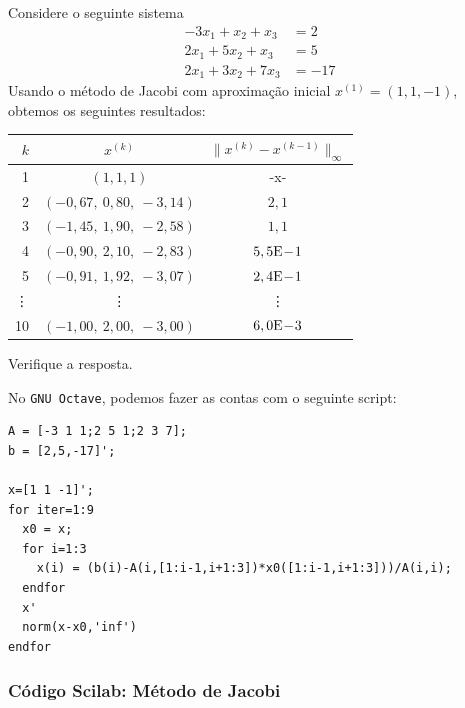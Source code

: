 \begin{ex}
  Considere o seguinte sistema
  \begin{equation}
    \begin{split}
      -3x_1 + x_2 + x_3 &= 2\\
      2x_1 + 5x_2 + x_3 &= 5\\
      2x_1 + 3x_2 + 7x_3 &= -17
    \end{split}
  \end{equation}
Usando o método de Jacobi com aproximação inicial $x^{(1)} = (1, 1, -1)$, obtemos os seguintes resultados:
\begin{center}
  \begin{tabular}{rcc}\hline
    $k$ & $x^{(k)}$ & $\|x^{(k)}-x^{(k-1)}\|_\infty$\\\hline
    1   & $(1, 1, 1)$ & -x-\\
    2   & $(-0,67,~0,80,~-3,14)$ & $2,1$\\
    3   & $(-1,45,~1,90,~-2,58)$ & $1,1$\\
    4   & $(-0,90,~2,10,~-2,83)$ & $5,5\mathrm{E}\!-\!1$\\
    5   & $(-0,91,~1,92,~-3,07)$ & $2,4\mathrm{E}\!-\!1$\\
    \vdots & \vdots & \vdots\\
    10  & $(-1,00,~2,00,~-3,00)$ & $6,0\mathrm{E}\!-\!3$\\\hline
  \end{tabular}
\end{center}
Verifique a resposta.

\ifisscilab
\construirScilab
\fi
\ifisoctave
No \verb+GNU Octave+, podemos fazer as contas com o seguinte script:
\begin{verbatim}
A = [-3 1 1;2 5 1;2 3 7];
b = [2,5,-17]';

x=[1 1 -1]';
for iter=1:9
  x0 = x;
  for i=1:3
    x(i) = (b(i)-A(i,[1:i-1,i+1:3])*x0([1:i-1,i+1:3]))/A(i,i);
  endfor
  x'
  norm(x-x0,'inf')
endfor
\end{verbatim}
\fi
\ifispython
\construirPython
\fi
\end{ex}

\ifisscilab
\subsubsection{Código Scilab: Método de Jacobi}

